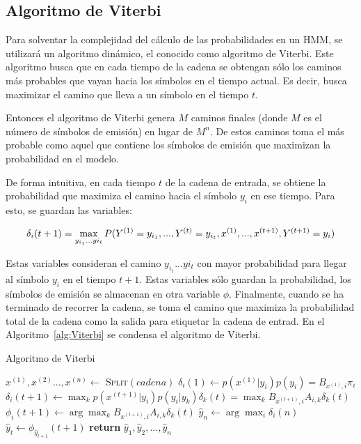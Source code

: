 \subsection{Algoritmo de Viterbi}

Para solventar la complejidad del cálculo de las probabilidades en un HMM, se utilizará un algoritmo dinámico, el conocido como algoritmo de Viterbi. Este algoritmo busca que en cada tiempo de la cadena se obtengan sólo los caminos más probables que vayan hacia los símbolos en el tiempo actual. Es decir, busca maximizar el camino que lleva a un símbolo en el tiempo $t$.

Entonces el algoritmo de Viterbi genera $M$ caminos finales (donde $M$ es el número de símbolos de emisión) en lugar de $M^n$. De estos caminos toma el más probable como aquel que contiene los símbolos de emisión que maximizan la probabilidad en el modelo.

De forma intuitiva, en cada tiempo $t$ de la cadena de entrada, se obtiene la probabilidad que maximiza el camino hacia el símbolo $y_i$ en ese tiempo. Para esto, se guardan las variables:

\begin{equation*}
\small
\delta_i(t+1) = \max_{y_{i_1}...y{i_t}} P(Y^{(1)}=y_{i_1}, ...,Y^{(t)}=y_{i_t}, x^{(1)},...,x^{(t+1)}, Y^{(t+1)}=y_i)     
\end{equation*}

Estas variables consideran el camino $y_{i_1}...y{i_t}$ con mayor probabilidad para llegar al símbolo $y_i$ en el tiempo $t+1$. Estas variables sólo guardan la probabilidad, los símbolos de emisión se almacenan en otra variable $\phi$. Finalmente, cuando se ha terminado de recorrer la cadena, se toma el camino que maximiza la probabilidad total de la cadena como la salida para etiquetar la cadena de entrad. En el Algoritmo~\ref{alg:Viterbi} se condensa el algoritmo de Viterbi.



\begin{algorithm}
 \caption{Algoritmo de Viterbi}\label{alg:Viterbi}
 \begin{algorithmic}
    \State $x^{(1)},x^{(2)}...,x^{(n)} \leftarrow$ \textsc{Split}$(cadena)$
    \State $\delta_i(1) \leftarrow p(x^{(1)}|y_i) p(y_i) = B_{x^{(1)}, i} \pi_i$ 
      \State $\delta_i(t+1) \leftarrow \max_k p(x^{(t+1)}|y_i)p(y_i|y_k)\delta_k(t) = \max_k B_{ x^{(t+1)}, i} A_{i,k} \delta_k(t) $
      \State $\phi_i(t+1) \leftarrow \arg\max_k B_{ x^{(t+1)}, i} A_{i,k} \delta_k(t) $
    \EndFor
    \State $\hat{y}_n \leftarrow \arg\max_i \delta_i(n)$
     \State $\hat{y}_t \leftarrow \phi_{\hat{y}_{t+1}}(t+1)$
    \EndFor
    \State \textbf{return} $\hat{y}_1, \hat{y}_2, ..., \hat{y}_n $
  \EndFunction
 \end{algorithmic}
\end{algorithm}

